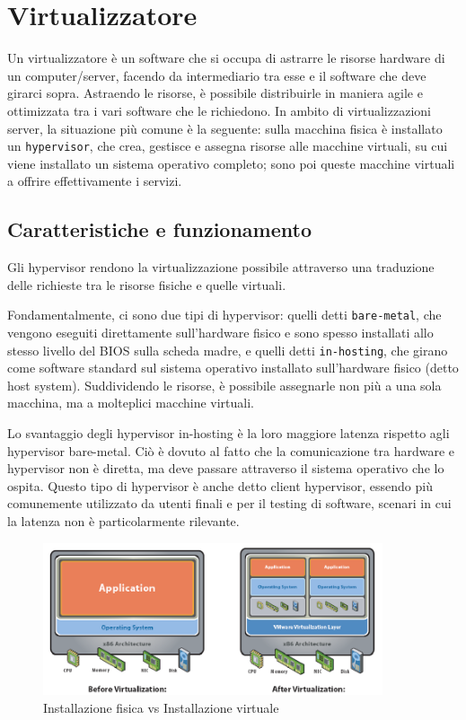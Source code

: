 \section{Virtualizzatore}
Un virtualizzatore è un software che si occupa di astrarre le risorse hardware di un computer/server, facendo da intermediario tra esse e il software che deve girarci sopra. Astraendo le risorse, è possibile distribuirle in maniera agile e ottimizzata tra i vari software che le richiedono.
In ambito di virtualizzazioni server, la situazione più comune è la seguente: sulla macchina fisica è installato un \texttt{hypervisor}, che crea, gestisce e assegna risorse alle macchine virtuali, su cui viene installato un sistema operativo completo; sono poi queste macchine virtuali a offrire effettivamente i servizi.

\subsection{Caratteristiche e funzionamento}
Gli hypervisor rendono la virtualizzazione possibile attraverso una traduzione delle richieste tra le risorse fisiche e quelle virtuali.

Fondamentalmente, ci sono due tipi di hypervisor: quelli detti \texttt{bare-metal}, che vengono eseguiti direttamente sull'hardware fisico e sono spesso installati allo stesso livello del BIOS sulla scheda madre, e quelli detti \texttt{in-hosting}, che girano come software standard sul sistema operativo installato sull'hardware fisico (detto host system). Suddividendo le risorse, è possibile assegnarle non più a una sola macchina, ma a molteplici macchine virtuali.

Lo svantaggio degli hypervisor in-hosting è la loro maggiore latenza rispetto agli hypervisor bare-metal. Ciò è dovuto al fatto che la comunicazione tra hardware e hypervisor non è diretta, ma deve passare attraverso il sistema operativo che lo ospita. Questo tipo di hypervisor è anche detto client hypervisor, essendo più comunemente utilizzato da utenti finali e per il testing di software, scenari in cui la latenza non è particolarmente rilevante.

\begin{figure}[ht]
    \centering
    \includegraphics[width=10cm]{figure/virtualization.png}
    \caption{Installazione fisica vs Installazione virtuale}
\end{figure}

